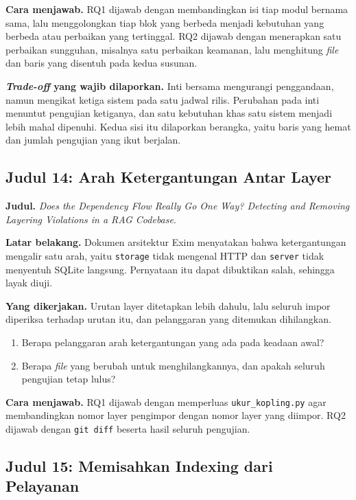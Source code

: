 \textbf{Cara menjawab.} RQ1 dijawab dengan membandingkan isi tiap modul
bernama sama, lalu menggolongkan tiap blok yang berbeda menjadi kebutuhan yang
berbeda atau perbaikan yang tertinggal. RQ2 dijawab dengan menerapkan satu
perbaikan sungguhan, misalnya satu perbaikan keamanan, lalu menghitung \textit{file}
dan baris yang disentuh pada kedua susunan.

\textbf{\textit{Trade-off} yang wajib dilaporkan.}
Inti bersama mengurangi
penggandaan, namun mengikat ketiga sistem pada satu jadwal rilis. Perubahan
pada inti menuntut pengujian ketiganya, dan satu kebutuhan khas satu sistem
menjadi lebih mahal dipenuhi. Kedua sisi itu dilaporkan berangka, yaitu baris
yang hemat dan jumlah pengujian yang ikut berjalan.

\subsection*{Judul 14: Arah Ketergantungan Antar Layer}

\textbf{Judul.} \textit{Does the Dependency Flow Really Go One Way? Detecting
and Removing Layering Violations in a RAG Codebase}.

\textbf{Latar belakang.} Dokumen arsitektur Exim menyatakan bahwa
ketergantungan mengalir satu arah, yaitu \texttt{storage} tidak mengenal HTTP
dan \texttt{server} tidak menyentuh SQLite langsung. Pernyataan itu dapat
dibuktikan salah, sehingga layak diuji.

\textbf{Yang dikerjakan.} Urutan layer ditetapkan lebih dahulu, lalu seluruh
impor diperiksa terhadap urutan itu, dan pelanggaran yang ditemukan
dihilangkan.

\begin{enumerate}
  \item Berapa pelanggaran arah ketergantungan yang ada pada keadaan awal?
  \item Berapa \textit{file} yang berubah untuk menghilangkannya, dan apakah seluruh
    pengujian tetap lulus?
\end{enumerate}

\textbf{Cara menjawab.} RQ1 dijawab dengan memperluas
\texttt{ukur\_kopling.py} agar membandingkan nomor layer pengimpor dengan
nomor layer yang diimpor. RQ2 dijawab dengan \texttt{git diff} beserta hasil
seluruh pengujian.

\subsection*{Judul 15: Memisahkan Indexing dari Pelayanan}

